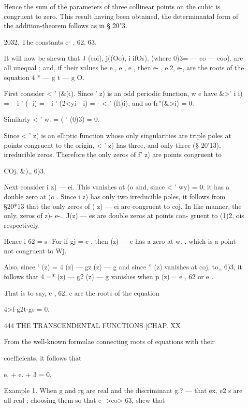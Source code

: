 {Hence the sum of the parameters of three collinear points on the cubic is congruent to 
zero. This result having been obtained, the determinantal form of the addition-theorem 
follows as in § 20"3. 

2032. The constants e- , 62, 63. 

It will now be shewn that  J (coi),  j((Oo), i ifOs), (where 0)3= — co  — coo), are 
all unequal ; and, if their values be e , e , e , then e- , e.2, e-, are the roots of the 
equation 4 * — g t — g O. 

First consider < ' (\&)i). Since  '  z) is an odd periodic function, w e have 
\&>' i i) = ~ i ' (-  i) = - i ' (2<yi -  i) = - < ' (ft)i), 
and so fr''(\&>i) = 0. 

Similarly < '  w.  = ( ' (0)3) = 0. 

Since < '  z) is an elliptic function whose only singularities are triple poles 
at points congruent to the origin, < '  z) has three, and only three (§ 20'13), 
irreducible zeros. Therefore the only zeros of f'  z) are points congruent to 

COj, \&),, 6)3. 

Next consider i  z) — ei. This vanishes at (o  and, since < ' wy) = 0, it has 
a double zero at (o . Since i  z) has only two irreducible poles, it follows 
from §20*13 that the only zeros of (  z) — ei are congruent to coj. In like 
manner, the only. zeros of   z)- e-.,  J(z) — es are double zeros at points con- 
gruent to (1)2, ois respectively. 

Hence  i   62 = s- For if gj = e , then   (z) — e  has a zero at w. , which is 
a point not congruent to Wj. 

Also, since  '  (z) = 4   (z) — gz  (z) — g  and since  '' (z) vanishes at coj, to,, 
6)3, it follows that 4 =* (z) — g2  (z) — g  vanishes when p (z) = e , 62 or e . 

That is to say, e , 62, e  are the roots of the equation 

4>f-g2t-gs = 0. 



444 THE TRANSCENDENTAL FUNCTIONS [CHAP. XX 

From the well-known formulae connecting roots of equations with their 

coefficients, it follows that 

e, + e. +  3 = 0, 

Example 1. When g  and rg are real and the discriminant g.? — %
that ex, e2   s are all real ; choosing them so that e- >eo> 63, shew that 

}
